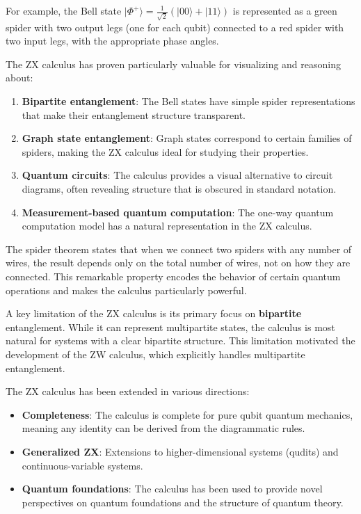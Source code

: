\documentclass[%
 amsmath,amssymb,
 aps,
rmp,
]{revtex4-2}
\begin{document}
For example, the Bell state $|\Phi^+\rangle = \frac{1}{\sqrt{2}}(|00\rangle + |11\rangle)$ is represented as a green spider with two output legs (one for each qubit) connected to a red spider with two input legs, with the appropriate phase angles.

The ZX calculus has proven particularly valuable for visualizing and reasoning about:
\begin{enumerate}
	\item \textbf{Bipartite entanglement}: The Bell states have simple spider representations that make their entanglement structure transparent.
	\item \textbf{Graph state entanglement}: Graph states correspond to certain families of spiders, making the ZX calculus ideal for studying their properties.
	\item \textbf{Quantum circuits}: The calculus provides a visual alternative to circuit diagrams, often revealing structure that is obscured in standard notation.
	\item \textbf{Measurement-based quantum computation}: The one-way quantum computation model has a natural representation in the ZX calculus.
\end{enumerate}

The spider theorem states that when we connect two spiders with any number of wires, the result depends only on the total number of wires, not on how they are connected. This remarkable property encodes the behavior of certain quantum operations and makes the calculus particularly powerful.

A key limitation of the ZX calculus is its primary focus on \textbf{bipartite} entanglement. While it can represent multipartite states, the calculus is most natural for systems with a clear bipartite structure. This limitation motivated the development of the ZW calculus, which explicitly handles multipartite entanglement.

The ZX calculus has been extended in various directions:
\begin{itemize}
	\item \textbf{Completeness}: The calculus is complete for pure qubit quantum mechanics, meaning any identity can be derived from the diagrammatic rules.
	\item \textbf{Generalized ZX}: Extensions to higher-dimensional systems (qudits) and continuous-variable systems.
	\item \textbf{Quantum foundations}: The calculus has been used to provide novel perspectives on quantum foundations and the structure of quantum theory.
\end{itemize}
\end{document}
